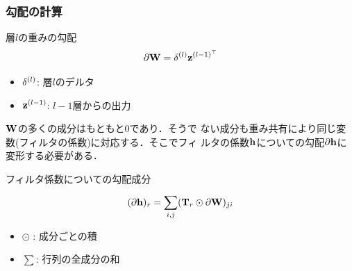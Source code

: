 \documentclass[dvipdfmx,11pt,notheorems]{beamer}
\theoremstyle{definition}
\begin{document}
\begin{frame}[fragile]\frametitle{勾配の計算}

 \begin{block}{層$l$の重みの勾配}
  \begin{equation}
  \partial{\bf W}= {\bf \delta}^{(l)}{\bf z}^{{(l-1)}^\top}
  \end{equation}
 \end{block}

 \begin{itemize}
	\item ${\bf \delta}^{(l)}$: 層$l$のデルタ
	\item ${\bf z}^{(l-1)}$: $l-1$層からの出力
 \end{itemize}

${\bf W}$の多くの成分はもともと0であり．そうで
ない成分も重み共有により同じ変数(フィルタの係数)に対応する．そこでフィ
ルタの係数$\bf{h}$についての勾配$\partial{\bf h}$に変形する必要がある．

 \begin{block}{フィルタ係数についての勾配成分}
	\begin{equation}
 (\partial{\bf h})_r =\sum_{i,j}^{}({\bf T}_r\odot\partial{\bf W})_{ji}
	\end{equation}
 \end{block}

\begin{itemize}
 \item $\odot$ : 成分ごとの積
 \item $\sum_{}^{}$: 行列の全成分の和
\end{itemize}

\end{frame}


\end{document}
